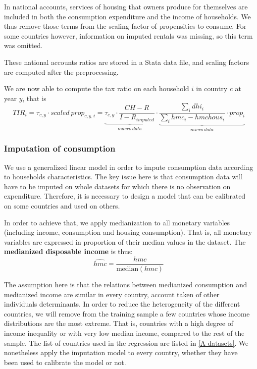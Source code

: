 \documentclass[12pt]{article}
\begin{document}
In national accounts, services of housing that owners produce for themselves are included in both the consumption expenditure and the income of households. We thus remove those terms from the scaling factor of propensities to consume. For some countries however, information on imputed rentals was missing, so this term was omitted.

These national accounts ratios are stored in a Stata data file, and scaling factors are computed after the preprocessing.

We are now able to compute the tax ratio on each household $i$ in country $c$ at year $y$, that is
\[ TIR_i = \tau_{c,y} \cdot scaled\ prop_{c,y,i} = \underbrace{\tau_{c,y} \cdot \frac{CH-R}{I-R_{imputed}}}_{macro\ data} \cdot \underbrace{\frac{\sum_i dhi_i}{\sum_i hmc_i-hmchous_i } \cdot prop_i}_{micro\ data}  \]

\subsubsection{Imputation of consumption}
\label{subsub:imput}
We use a generalized linear model in order to impute consumption data according to households characteristics. The key issue here is that consumption data will have to be imputed on whole datasets for which there is no observation on expenditure. Therefore, it is necessary to design a model that can be calibrated on some countries and used on others.

In order to achieve that, we apply medianization to all monetary variables (including income, consumption and housing consumption). That is, all monetary variables are expressed in proportion of their median values in the dataset. The \textbf{medianized disposable income} is thus:
\[ \widehat{hmc} = \frac{hmc}{\text{median}(hmc)} \]

The assumption here is that the relations between medianized consumption and medianized income are similar in every country, account taken of other individuals determinants. In order to reduce the heterogeneity of the different countries, we will remove from the training sample a few countries whose income distributions are the most extreme. That is, countries with a high degree of income inequality or with very low median income, compared to the rest of the sample. The list of countries used in the regression are listed in \cref{A-datasets}. We nonetheless apply the imputation model to every country, whether they have been used to calibrate the model or not.
\end{document}
